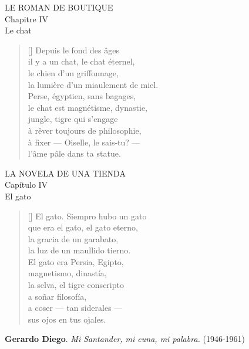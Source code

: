 


\begin{center}
LE ROMAN DE BOUTIQUE \\
Chapitre IV \\
Le chat
\end{center}

\settowidth{\versewidth}{à fixer --- Oiselle, le sais-tu? ---}

\bigskip

\begin{verse}[\versewidth]
Depuis le fond des âges \\
il y a un chat, le chat éternel, \\
le chien d'un griffonnage, \\
la lumière d'un miaulement de miel. \\
Perse, égyptien, sans bagages, \\
le chat est magnétisme, dynastie, \\
jungle, tigre qui s'engage \\
à rêver toujours de philosophie, \\
à fixer --- Oiselle, le sais-tu? --- \\
l'âme pâle dans ta statue.
\end{verse}

\bigskip \bigskip


\begin{center}
LA NOVELA DE UNA TIENDA \\
Capítulo IV \\
El gato
\end{center}

\poemtitle*{}

\settowidth{\versewidth}{que era el gato, el gato eterno,}

\bigskip

\begin{verse}[\versewidth]
El gato. Siempro hubo un gato \\
que era el gato, el gato eterno, \\
la gracia de un garabato, \\
la luz de un maullido tierno. \\
El gato era Persia, Egipto, \\
magnetismo, dinastía, \\
la selva, el tigre conscripto \\
a soñar filosofía, \\
a coser --- tan siderales --- \\
sus ojos en tus ojales.
\end{verse}

\bigskip \bigskip

\hspace*{10mm} {\bf Gerardo Diego}. {\em Mi Santander, mi cuna, mi palabra.} (1946-1961)
